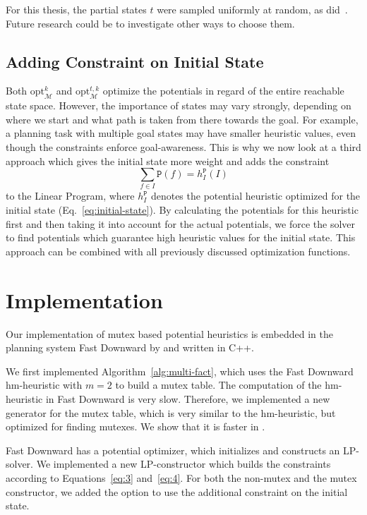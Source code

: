 For this thesis, the partial states $t$ were sampled uniformly at random, as did~\citeauthor{fivser2020strengthening}.
Future research could be to investigate other ways to choose them.

\subsection{Adding Constraint on Initial State}\label{subsec:adding-constraint-on-initial-state}
Both $\mathrm{opt}^k_\mathcal{M}$ and $\mathrm{opt}^{t,k}_\mathcal{M}$ optimize the potentials in regard of the entire reachable state space.
However, the importance of states may vary strongly, depending on where we start and what path is taken from there towards the goal.
For example, a planning task with multiple goal states may have smaller heuristic values, even though the constraints enforce goal-awareness.
This is why we now look at a third approach which gives the initial state more weight and adds the constraint  \begin{equation}\sum_{f\in I}\mathtt{P}(f)=h^\mathtt{P}_I (I)\end{equation} to the Linear Program, where $h^\mathtt{P}_I$ denotes the potential heuristic optimized for the initial state (Eq.~\eqref{eq:initial-state}).
By calculating the potentials for this heuristic first and then taking it into account for the actual potentials, we force the solver to find potentials which guarantee high heuristic values for the initial state.
This approach can be combined with all previously discussed optimization functions.

\section{Implementation}\label{sec:implementation}
Our implementation of mutex based potential heuristics is embedded in the planning system Fast Downward by \citeauthor{helmert2006fast} and written in C++.

We first implemented Algorithm~\ref{alg:multi-fact}, which uses the Fast Downward hm-heuristic with $m=2$ to build a mutex table.
The computation of the hm-heuristic in Fast Downward is very slow.
Therefore, we implemented a new generator for the mutex table, which is very similar to the hm-heuristic, but optimized for finding mutexes.
We show that it is faster in .

Fast Downward has a potential optimizer, which initializes and constructs an LP-solver.
We implemented a new LP-constructor which builds the constraints according to Equations~\eqref{eq:3} and~\eqref{eq:4}.
For both the non-mutex and the mutex constructor, we added the option to use the additional constraint on the initial state.

